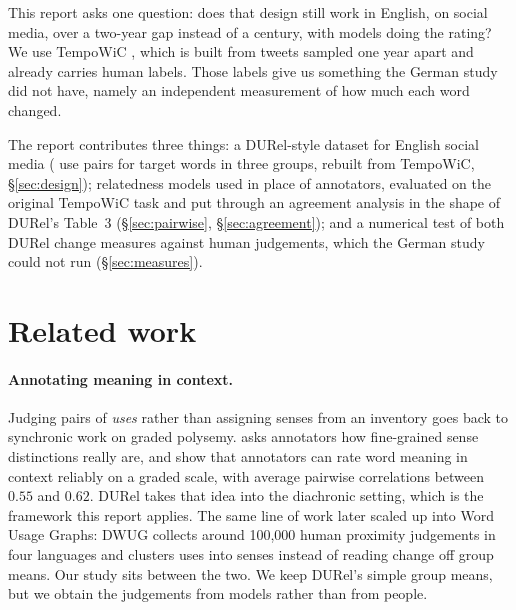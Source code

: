 \documentclass{article}
\newif\iffirstsectiondone
\let\originalsection\section
\renewcommand{\section}{%
  \iffirstsectiondone\Needspace*{0.12\textheight}\else\firstsectiondonetrue\fi
  \originalsection}
\begin{document}
This report asks one question: does that design still work in English, on social
media, over a two-year gap instead of a century, with models doing the rating?
We use TempoWiC \citep{loureiro2022tempowic}, which is built from tweets sampled
one year apart and already carries human labels. Those labels give us something
the German study did not have, namely an independent measurement of how much
each word changed.

The report contributes three things: a DURel-style dataset for English social
media (\numTotalPairs{} use pairs for \numWords{} target words in three groups,
rebuilt from TempoWiC, \S\ref{sec:design}); relatedness models used in place of
annotators, evaluated on the original TempoWiC task and put through an agreement
analysis in the shape of DURel's Table~3 (\S\ref{sec:pairwise},
\S\ref{sec:agreement}); and a numerical test of both DURel change measures
against human judgements, which the German study could not run
(\S\ref{sec:measures}).

\section{Related work}
\label{sec:related}

\paragraph{Annotating meaning in context.} Judging pairs of \emph{uses} rather
than assigning senses from an inventory goes back to synchronic work on graded
polysemy. \citet{brown2008choosing} asks annotators how fine-grained sense
distinctions really are, and \citet{erk2013measuring} show that annotators can
rate word meaning in context reliably on a graded scale, with average pairwise
correlations between $0.55$ and $0.62$. DURel \citep{schlechtweg2018durel} takes
that idea into the diachronic setting, which is the framework this report
applies. The same line of work later scaled up into Word Usage Graphs: DWUG
\citep{schlechtweg2021dwug} collects around 100{,}000 human proximity judgements
in four languages and clusters uses into senses instead of reading change off
group means. Our study sits between the two. We keep DURel's simple group means,
but we obtain the judgements from models rather than from people.
\end{document}
